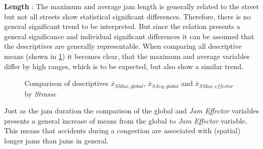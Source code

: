 \textbf{Length} : The maximum and average jam length is generally related to the street but not all streets show statistical significant differences. Therefore, there is no general significant trend to be interpreted. But since the relation presents a general significance and individual significant differences it can be assumed that the descriptives are generally representable. When comparing all descriptive means (shown in \cref{fig:baysis_summary_Str_length_barplot}) it becomes clear, that the maximum and average variables differ by high ranges, which is to be expected, but also show a similar trend.
\begin{figure}[ht!]
    \data
    \pgfplotstablesort[sort key=means, sort cmp=float >]{\datasorted}{\data}
    \tiny
    \centering
    \caption{Comparison of descriptives $\bar{x}_{SMax,global}$, $\bar{x}_{SAvg,global}$ and $\bar{x}_{SMax,effector}$ by \textit{Strasse}}
    \label{fig:baysis_summary_Str_length_barplot}
\end{figure}
Just as the jam duration the comparison of the global and \textit{Jam Effector} variables presents a general increase of means from the global to \textit{Jam Effector} variable. This means that accidents during a congestion are associated with (spatial) longer jams than jams in general.

